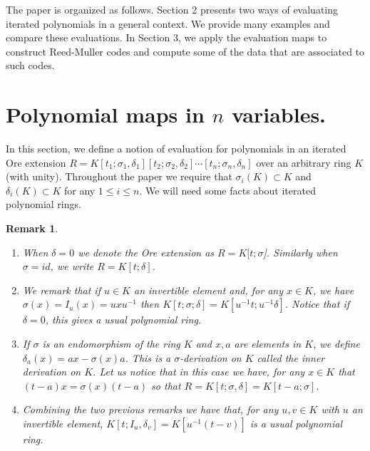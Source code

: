 \documentclass{amsproc}
\newcommand{\de}{\delta}
\newcommand{\si}{\sigma}
\newtheorem{remark}[theorem]{Remark}
\numberwithin{equation}{section}
\newcommand{\mulo}{K[t_1;\si_1,\de_1][t_2;\si_2,\de_2]\cdots[t_n;\si_n,\de_n]}
\begin{document}
The paper is organized as follows. Section 2 presents two ways of evaluating iterated polynomials in a general context.  We provide many examples and compare these evaluations.  
In Section 3, we apply the evaluation maps to construct 
Reed-Muller codes and compute some of the data that are associated to such codes.

%
%
\section{Polynomial maps in $n$ variables.} 

In this section, we define a notion
of evaluation for polynomials in an iterated Ore extension $R=\mulo$ over an arbitrary ring $K$ (with unity).   Throughout the paper we require that $\si_i(K)\subset K$ and $\de_i(K)\subset K$ for any $1\le i \le n$.
We will need some facts about iterated polynomial rings.
\begin{remark}
	\label{First remarks} 
	\label{inner auto and inner derivations}
	{\rm 
		\begin{enumerate}
			\item When $\de=0$ we denote the Ore extension as $R=K[t;\si$].  Similarly when $\si=id$, we write $R=K[t;\de]$.
			\item We remark that if $u\in K$  an invertible element and, for any $x\in K$, we have $\si(x)=I_u(x)=uxu^{-1}$ then $K[t;\si;\de]
			=K[u^{-1}t;u^{-1}\delta]$.  Notice that if $\delta=0$, this gives a usual polynomial ring.
			\item If $\si$ is an endomorphism of the ring $K$ and $x,a$ are elements in $K$, we define $\de_a(x)=ax-\si(x)a$.   This is a $\si$-derivation on $K$ called the inner derivation on $K$.
			Let us notice that in this case we have, for any $x\in K$ that
			$(t-a)x=\si(x)(t-a)$ so that $R=K[t;\si,\de]=K[t-a;\si]$.
			\item Combining the two previous remarks we have that, for any $u,v\in K$ with $u$ an invertible element,  $K[t;I_u,\de_v]=K[u^{-1}(t-v)]$ is a usual polynomial ring.
		\end{enumerate}
	}
\end{remark}
\end{document}
